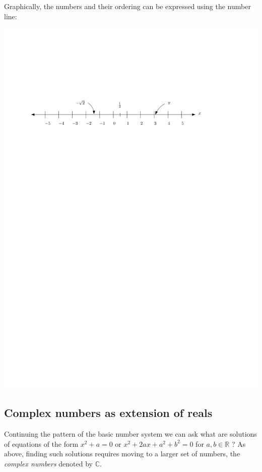 Graphically, the numbers and their ordering can be expressed using the number line:

\begin{center}
  \includegraphics[scale=1]{graphics/number-line.pdf}
\end{center}

\subsection*{Complex numbers as extension of reals}

Continuing the pattern of the basic number system we can ask what are solutions of equations of the form $x^2+a = 0$ or $x^2 + 2ax +a^2 + b^2 = 0$ for $a,b \in \mathbb{R}$ ? As above, finding such solutions requires moving to a larger set of numbers, the \emph{complex numbers} denoted by $\mathbb{C}$.


